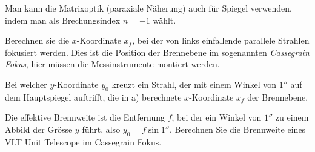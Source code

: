 Man kann die Matrixoptik (paraxiale Näherung) auch für Spiegel verwenden,
indem man als Brechungsindex $n=-1$ wählt.
\begin{teilaufgaben}
\item
Berechnen sie die $x$-Koordinate $x_f$, bei der von links einfallende
parallele Strahlen fokusiert werden.
Dies ist die Position der Brennebene im sogenannten {\em Cassegrain Fokus},
hier müssen die Messinstrumente montiert werden.
\item
Bei welcher $y$-Koordinate $y_0$ kreuzt ein Strahl,
der mit einem Winkel von $1''$
auf dem Hauptspiegel auftrifft, die in a) berechnete $x$-Koordinate $x_f$ der
Brennebene.
\item
Die effektive Brennweite ist die Entfernung $f$, bei der ein Winkel von
$1''$ zu einem Abbild der Grösse $y$ führt, also $y_0=f\sin 1''$.
Berechnen Sie die Brennweite eines VLT Unit Telescope im Cassegrain Fokus.
\end{teilaufgaben}

